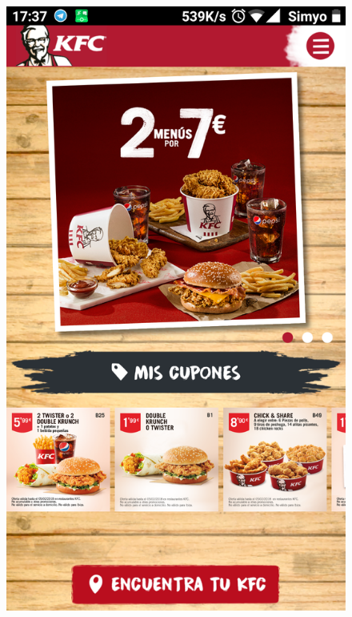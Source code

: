 \documentclass[twoside]{report}
\begin{document}
\begin{figure}[H]
\begin{center}
\includegraphics[scale=0.25]{images/restaurantes/kfc0.png}

\end{center}
\end{figure}
\end{document}
